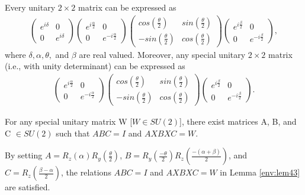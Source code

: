 \begin{lemma} %
Every unitary $2\times 2$ matrix can be expressed as
\begin{align*}
\begin{pmatrix}
e^{i\delta} & 0\\
0 & e^{i\delta}
\end{pmatrix}
\begin{pmatrix}
e^{i\frac{\alpha}{2}} & 0\\
0 & e^{-i\frac{\alpha}{2}}
\end{pmatrix}
\begin{pmatrix}
cos\left(\frac{\theta}{2}\right) & sin\left(\frac{\theta}{2}\right)\\
-sin\left(\frac{\theta}{2}\right) & cos\left(\frac{\theta}{2}\right)
\end{pmatrix}
\begin{pmatrix}
e^{i\frac{\beta}{2}} & 0\\
0 & e^{-i\frac{\beta}{2}}
\end{pmatrix},
\end{align*}
where $\delta, \alpha, \theta,$ and $\beta$ are real valued. Moreover, any special unitary $2 \times 2$ matrix (i.e., with unity determinant) can be expressed as
\begin{align*}
\begin{pmatrix}
e^{i\frac{\alpha}{2}} & 0\\
0 & e^{-i\frac{\alpha}{2}}
\end{pmatrix}
\begin{pmatrix}
cos\left(\frac{\theta}{2}\right) & sin\left(\frac{\theta}{2}\right)\\
-sin\left(\frac{\theta}{2}\right) & cos\left(\frac{\theta}{2}\right)
\end{pmatrix}
\begin{pmatrix}
e^{i\frac{\beta}{2}} & 0\\
0 & e^{-i\frac{\beta}{2}}
\end{pmatrix}.
\end{align*}
\end{lemma}

\begin{lemma}\label{env:lem43} %
For any special unitary matrix W [$W \in SU(2)$], there exist matrices A, B, and C $\in SU(2)$ such that $ABC=I$ and $AXBXC=W$.
\end{lemma}
By setting $A=R_z\left(\alpha\right)R_y\left(\frac{\theta}{2}\right)$, $B=R_y\left(\frac{-\theta}{2}\right)R_z\left(\frac{-\left(\alpha + \beta\right)}{2}\right)$, and $C=R_z\left(\frac{\beta - \alpha}{2}\right)$, the relations $ABC=I$ and $AXBXC=W$ in Lemma \ref{env:lem43} are satisfied.

